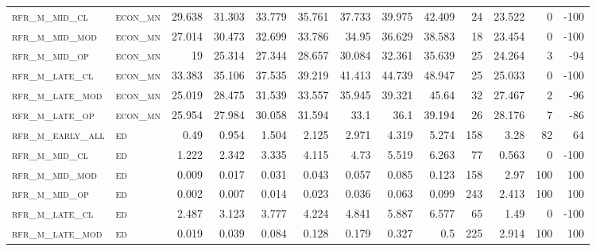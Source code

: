 \begin{landscape}
\begin{center}
\begin{footnotesize}
\begin{longtable}{llrrrrrrrr|rrr}
\textsc{rfr\_m\_mid\_cl   } & \textsc{econ\_mn  }   & 29.638  & 31.303  & 33.779  & 35.761   & 37.733   & 39.975   & 42.409   & 24     & 23.522        & 0             & -100            \\
\textsc{rfr\_m\_mid\_mod  } & \textsc{econ\_mn  }   & 27.014  & 30.473  & 32.699  & 33.786   & 34.95    & 36.629   & 38.583   & 18     & 23.454        & 0             & -100            \\
\textsc{rfr\_m\_mid\_op   } & \textsc{econ\_mn  }   & 19      & 25.314  & 27.344  & 28.657   & 30.084   & 32.361   & 35.639   & 25     & 24.264        & 3             & -94             \\
\textsc{rfr\_m\_late\_cl  } & \textsc{econ\_mn  }   & 33.383  & 35.106  & 37.535  & 39.219   & 41.413   & 44.739   & 48.947   & 25     & 25.033        & 0             & -100            \\
\textsc{rfr\_m\_late\_mod } & \textsc{econ\_mn  }   & 25.019  & 28.475  & 31.539  & 33.557   & 35.945   & 39.321   & 45.64    & 32     & 27.467        & 2             & -96             \\
\textsc{rfr\_m\_late\_op  } & \textsc{econ\_mn  }   & 25.954  & 27.984  & 30.058  & 31.594   & 33.1     & 36.1     & 39.194   & 26     & 28.176        & 7             & -86             \\
\textsc{rfr\_m\_early\_all} & \textsc{ed        }   & 0.49    & 0.954   & 1.504   & 2.125    & 2.971    & 4.319    & 5.274    & 158    & 3.28          & 82            & 64              \\
\textsc{rfr\_m\_mid\_cl   } & \textsc{ed        }   & 1.222   & 2.342   & 3.335   & 4.115    & 4.73     & 5.519    & 6.263    & 77     & 0.563         & 0             & -100            \\
\textsc{rfr\_m\_mid\_mod  } & \textsc{ed        }   & 0.009   & 0.017   & 0.031   & 0.043    & 0.057    & 0.085    & 0.123    & 158    & 2.97          & 100           & 100             \\
\textsc{rfr\_m\_mid\_op   } & \textsc{ed        }   & 0.002   & 0.007   & 0.014   & 0.023    & 0.036    & 0.063    & 0.099    & 243    & 2.413         & 100           & 100             \\
\textsc{rfr\_m\_late\_cl  } & \textsc{ed        }   & 2.487   & 3.123   & 3.777   & 4.224    & 4.841    & 5.887    & 6.577    & 65     & 1.49          & 0             & -100            \\
\textsc{rfr\_m\_late\_mod } & \textsc{ed        }   & 0.019   & 0.039   & 0.084   & 0.128    & 0.179    & 0.327    & 0.5      & 225    & 2.914         & 100           & 100             \\

\end{longtable}
\end{footnotesize}
\end{center}
\end{landscape}
